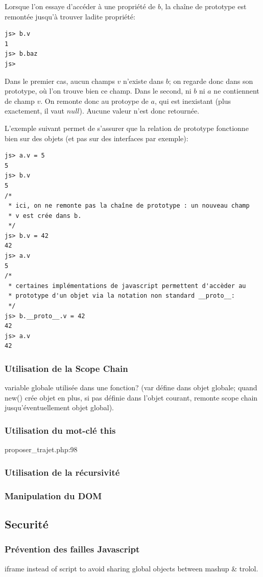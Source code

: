 \documentclass[a4paper]{article}
\begin{document}
Lorsque l'on essaye d'accéder à une propriété de $b$, la chaîne de prototype
est remontée jusqu'à trouver ladite propriété:
\begin{verbatim}
js> b.v
1
js> b.baz
js>
\end{verbatim}

Dans le premier cas, aucun champs $v$ n'existe dans $b$; on regarde donc
dans son prototype, où l'on trouve bien ce champ. Dans le second, ni $b$
ni $a$ ne contiennent de champ $v$. On remonte donc au protoype de $a$,
qui est inexistant (plus exactement, il vaut $null$). Aucune valeur n'est
donc retournée.

L'exemple suivant permet de s'assurer que la relation de prototype fonctionne
bien sur des objets (et pas sur des interfaces par exemple):
\begin{verbatim}
js> a.v = 5
5
js> b.v
5
/*
 * ici, on ne remonte pas la chaîne de prototype : un nouveau champ
 * v est crée dans b.
 */
js> b.v = 42
42
js> a.v
5
/*
 * certaines implémentations de javascript permettent d'accèder au
 * prototype d'un objet via la notation non standard __proto__:
 */
js> b.__proto__.v = 42
42
js> a.v
42
\end{verbatim}

\subsubsection{Utilisation de la Scope Chain}
variable globale utilisée dans une fonction?
(var défine dans objet globale; quand new() crée
objet en plus, si pas définie dans l'objet courant,
remonte scope chain jusqu'éventuellement objet global).

\subsubsection{Utilisation du mot-clé this}
proposer\_trajet.php:98
\subsubsection{Utilisation de la récursivité}
\subsubsection{Manipulation du DOM}

\subsection{Securité} 
\subsubsection{Prévention des failles Javascript}
iframe instead of script to avoid sharing global objects
between mashup \& trolol.
\end{document}
